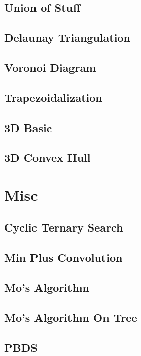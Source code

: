 \subsection{Union of Stuff}

\subsection{Delaunay Triangulation}

\subsection{Voronoi Diagram}

\subsection{Trapezoidalization}

\subsection{3D Basic}

\subsection{3D Convex Hull}


\section{Misc}
\subsection{Cyclic Ternary Search}

\subsection{Min Plus Convolution}

\subsection{Mo's Algorithm}

\subsection{Mo's Algorithm On Tree}

\subsection{PBDS}

%
